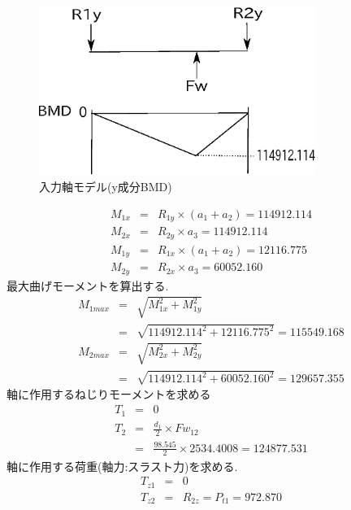 \begin{figure}[htbp]
\begin{center}
\includegraphics[width=9cm]{../picture/jiku13.eps}
\end{center}
\caption{入力軸モデル(y成分BMD)}
\end{figure}
\begin{eqnarray}
M_{1x} &=& R_{1y} \times (a_1+a_2)=114912.114\\
M_{2x} &=& R_{2y} \times a_3=114912.114\\
M_{1y} &=& R_{1x} \times (a_1+a_2)=12116.775\\
M_{2y} &=& R_{2x} \times a_3=60052.160
\end{eqnarray}
最大曲げモーメントを算出する.
\begin{eqnarray}
M_{1max} &=& \sqrt {M_{1x}^2+M_{1y}^2}\\
         &=& \sqrt {114912.114^2+12116.775^2}=115549.168\\
M_{2max} &=& \sqrt {M_{2x}^2+M_{2y}^2}\\
         &=& \sqrt {114912.114^2+60052.160^2}=129657.355
\end{eqnarray}
軸に作用するねじりモーメントを求める
\begin{eqnarray}
T_{1} &=& 0\\
T_{2} &=& \frac{d_1}{2} \times Fw_{12}\\
      &=& \frac{98.545}{2} \times 2534.4008 = 124877.531
\end{eqnarray}
軸に作用する荷重(軸力:スラスト力)を求める.
\begin{eqnarray}
T_{z1} &=& 0\\
T_{z2} &=& R_{2z} = P_{t1} = 972.870
\end{eqnarray}
